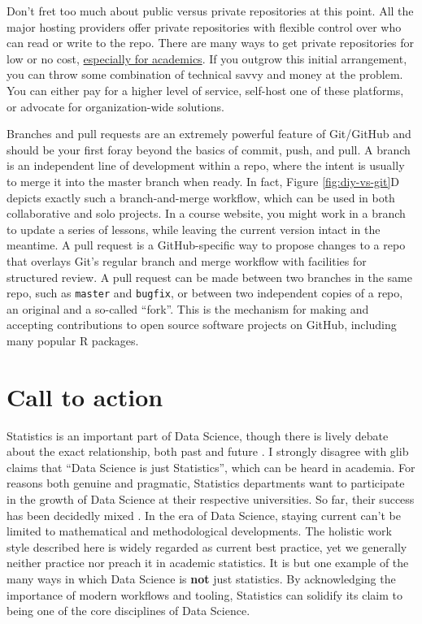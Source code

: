 \documentclass[12pt]{article}
\begin{document}
Don't fret too much about public versus private repositories at this
point. All the major hosting providers offer private repositories with
flexible control over who can read or write to the repo. There are many
ways to get private repositories for low or no cost,
\href{https://help.github.com/articles/discounted-organization-accounts/}{especially
for academics}. If you outgrow this initial arrangement, you can throw
some combination of technical savvy and money at the problem. You can
either pay for a higher level of service, self-host one of these
platforms, or advocate for organization-wide solutions.

Branches and pull requests are an extremely powerful feature of
Git/GitHub and should be your first foray beyond the basics of commit,
push, and pull. A branch is an independent line of development within a
repo, where the intent is usually to merge it into the master branch
when ready. In fact, Figure \ref{fig:diy-vs-git}D depicts exactly such a
branch-and-merge workflow, which can be used in both collaborative and
solo projects. In a course website, you might work in a branch to update
a series of lessons, while leaving the current version intact in the
meantime. A pull request is a GitHub-specific way to propose changes to
a repo that overlays Git's regular branch and merge workflow with
facilities for structured review. A pull request can be made between two
branches in the same repo, such as \texttt{master} and \texttt{bugfix},
or between two independent copies of a repo, an original and a so-called
``fork''. This is the mechanism for making and accepting contributions
to open source software projects on GitHub, including many popular R
packages.

\section{Call to action}\label{call-to-action}

Statistics is an important part of Data Science, though there is lively
debate about the exact relationship, both past and future
\citep{donoho}. I strongly disagree with glib claims that ``Data Science
is just Statistics'', which can be heard in academia. For reasons both
genuine and pragmatic, Statistics departments want to participate in the
growth of Data Science at their respective universities. So far, their
success has been decidedly mixed \citep{donoho}. In the era of Data
Science, staying current can't be limited to mathematical and
methodological developments. The holistic work style described here is
widely regarded as current best practice, yet we generally neither
practice nor preach it in academic statistics. It is but one example of
the many ways in which Data Science is \textbf{not} just statistics. By
acknowledging the importance of modern workflows and tooling, Statistics
can solidify its claim to being one of the core disciplines of Data
Science.
\end{document}
